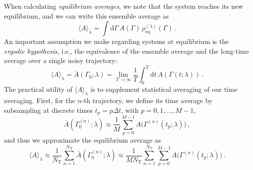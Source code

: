 When calculating \textit{equilibrium averages}, we note that the system reaches its new equilibrium, and we can write this ensemble average as 
\begin{equation}
\langle A\rangle_\lambda  = \int \mathrm{d} \Gamma\, A(\Gamma)\, \rho^{(\lambda)}_\mathrm{eq}(\Gamma) \,.
\end{equation}
An important assumption we make regarding systems at equilibrium is the \textit{ergodic hypothesis},\cite{tuckerman2010statistical,hansen2013theory} i.e., the equivalence of the ensemble average and the long-time average over a single noisy trajectory:
\begin{equation}
\langle A\rangle_\lambda  = \bar{A}(\Gamma_0; \lambda) 
= \lim_{T \to \infty} \frac{1}{T} \int_0^T \mathrm{d}t\, A(\Gamma(t;\lambda)) \,.
\end{equation}
The practical utility of $\langle A\rangle_\lambda$ is to supplement statistical averaging of our time averaging. First, for the $n$-th trajectory, we define its time average by subsampling at discrete times $t_p = p \Delta t$, with $p = 0,1,\ldots, M-1$, 
\begin{equation}
\bar{A}(\Gamma_0^{(n)}; \lambda) \approx \frac{1}{M} \sum_{p=0}^{M-1} A\bigl(\Gamma^{(n)}(t_p;\lambda)\bigr) \,,
\end{equation}
and thus we approximate the equilibrium average as
\begin{equation}
\langle A \rangle_\lambda \approx \frac{1}{N_\mathrm{T}} \sum_{n=1}^{N_\mathrm{T}}  \bar{A}(\Gamma_0^{(n)}; \lambda) 
\approx \frac{1}{M N_\mathrm{T}} \sum_{n=1}^{N_\mathrm{T}} \sum_{p=0}^{M-1} A\bigl(\Gamma^{(n)}(t_p;\lambda)\bigr) \,. \label{eq:Aeq_samplemean}
\end{equation}

